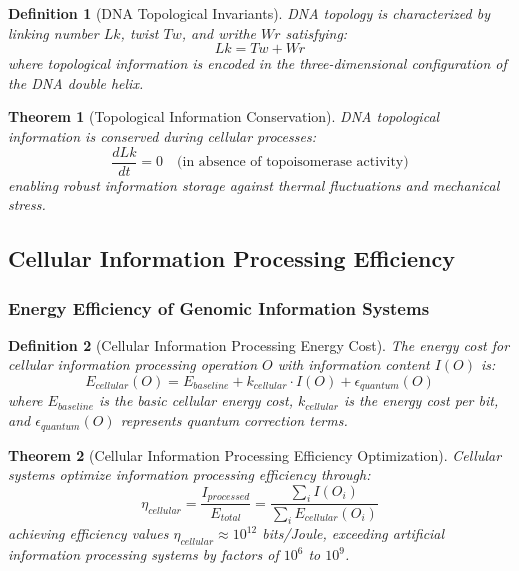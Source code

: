 \documentclass[12pt,a4paper]{article}
\newtheorem{theorem}{Theorem}
\newtheorem{definition}{Definition}
\begin{document}
\begin{definition}[DNA Topological Invariants]
DNA topology is characterized by linking number $Lk$, twist $Tw$, and writhe $Wr$ satisfying:
\begin{equation}
Lk = Tw + Wr
\end{equation}
where topological information is encoded in the three-dimensional configuration of the DNA double helix.
\end{definition}

\begin{theorem}[Topological Information Conservation]
DNA topological information is conserved during cellular processes:
\begin{equation}
\frac{dLk}{dt} = 0 \quad \text{(in absence of topoisomerase activity)}
\end{equation}
enabling robust information storage against thermal fluctuations and mechanical stress.
\end{theorem}

\subsection{Cellular Information Processing Efficiency}

\subsubsection{Energy Efficiency of Genomic Information Systems}

\begin{definition}[Cellular Information Processing Energy Cost]
The energy cost for cellular information processing operation $O$ with information content $I(O)$ is:
\begin{equation}
E_{cellular}(O) = E_{baseline} + k_{cellular} \cdot I(O) + \epsilon_{quantum}(O)
\end{equation}
where $E_{baseline}$ is the basic cellular energy cost, $k_{cellular}$ is the energy cost per bit, and $\epsilon_{quantum}(O)$ represents quantum correction terms.
\end{definition}

\begin{theorem}[Cellular Information Processing Efficiency Optimization]
Cellular systems optimize information processing efficiency through:
\begin{equation}
\eta_{cellular} = \frac{I_{processed}}{E_{total}} = \frac{\sum_i I(O_i)}{\sum_i E_{cellular}(O_i)}
\end{equation}
achieving efficiency values $\eta_{cellular} \approx 10^{12}$ bits/Joule, exceeding artificial information processing systems by factors of $10^6$ to $10^9$.
\end{theorem}
\end{document}
